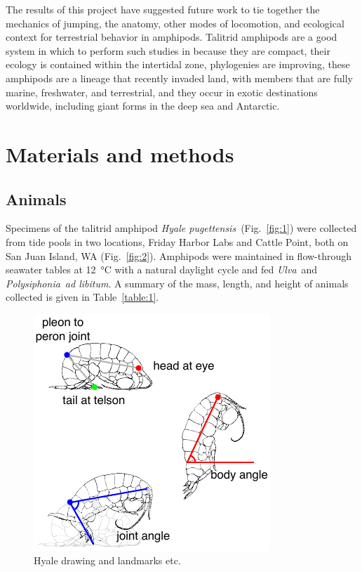 \documentclass{article}
\newcommand{\Genus}[1]{\emph{#1}}
\newcommand{\Hyalepugettensis}{\Genus{Hyale pugettensis}}
\begin{document}
The results of this project have suggested future work to tie together the mechanics of jumping, the anatomy, other modes of locomotion, and ecological context for terrestrial behavior in amphipods.  Talitrid amphipods are a good system in which to perform such studies in because they are compact, their ecology is contained within the intertidal zone, phylogenies are improving, these amphipods are a lineage that recently invaded land, with members that are fully marine, freshwater, and terrestrial, and they occur in exotic destinations worldwide, including giant forms in the deep sea and Antarctic.    










\section*{Materials and methods}
\subsection*{Animals}
	Specimens of the talitrid amphipod \Hyalepugettensis~(Fig.~\ref{fig:1}) were collected from tide pools in two locations, Friday Harbor Labs and Cattle Point, both on San Juan Island, WA (Fig.~\ref{fig:2}).  Amphipods were maintained in flow-through seawater tables at \SI{12}{\celsius} with a natural daylight cycle and fed \Genus{Ulva}~and \Genus{Polysiphonia}~\emph{ad libitum}.  A summary of the mass, length, and height of animals collected is given in Table~\ref{table:1}.
\begin{figure}
\begin{center}
\includegraphics{figures/HyaleLandmarks.pdf}
\end{center}
\caption{Hyale drawing and landmarks etc.}
\end{figure}
	
\end{document}
